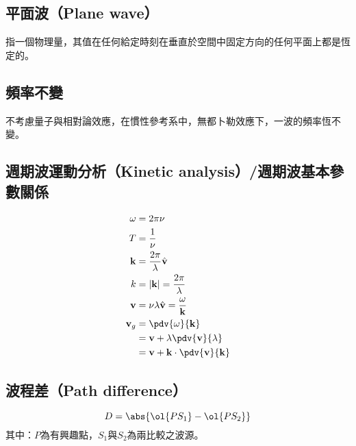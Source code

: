 \documentclass[a4paper,12pt]{report}
\begin{document}
\subsection{平面波（Plane wave）}
指一個物理量，其值在任何給定時刻在垂直於空間中固定方向的任何平面上都是恆定的。
\subsection{頻率不變}
不考慮量子與相對論效應，在慣性參考系中，無都卜勒效應下，一波的頻率恆不變。
\subsection{週期波運動分析（Kinetic analysis）/週期波基本參數關係}
\[\begin{aligned}
\omega &= 2\pi \nu \\
T &= \frac{1}{\nu} \\
\mathbf{k} &= \frac{2\pi}{\lambda}\hat{\mathbf{v}} \\
k &= |\mathbf{k}| = \frac{2\pi}{\lambda} \\
\mathbf{v} &= \nu \lambda \hat{\mathbf{v}} = \frac{\omega}{\mathbf{k}} \\
\mathbf{v}_g &= \pdv{\omega}{\mathbf{k}} \\
&= \mathbf{v}+\lambda \pdv{\mathbf{v}}{\lambda} \\
&= \mathbf{v}+\mathbf{k} \cdot\pdv{\mathbf{v}}{\mathbf{k}}
\end{aligned}\]
\subsection{波程差（Path difference）}
\[D=\abs{\ol{PS_1}-\ol{PS_2}}\]
其中：$P$為有興趣點，$S_1$與$S_2$為兩比較之波源。
\end{document}
